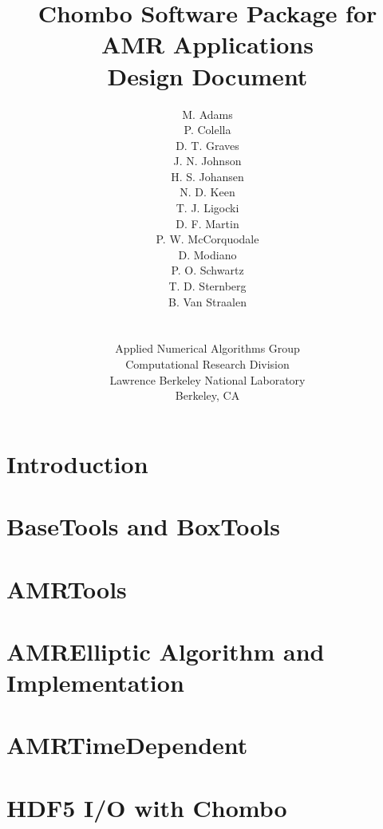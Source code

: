\documentclass[12pt]{report}
\title{Chombo Software Package for AMR Applications \\
       Design Document}
\author{M. Adams \\ P. Colella \\
        D. T. Graves \\ 
        J. N. Johnson \\
        H. S. Johansen \\
        N. D. Keen \\
        T. J. Ligocki \\ 
        D. F. Martin \\ 
        P. W. McCorquodale \\
        D. Modiano \\
        P. O. Schwartz \\
        T. D. Sternberg \\ 
        B. Van Straalen \\ 
        \\ \\
Applied Numerical Algorithms Group \\
Computational Research Division \\
Lawrence Berkeley National Laboratory \\
Berkeley, CA}
\begin{document}
\begin{figure}
\epsfxsize=3.75in
\hspace{1.0in}
\vspace{-0.75in}
\end{figure}

\maketitle

 

\tableofcontents

\chapter{Introduction}



\chapter{BaseTools and BoxTools}







\chapter{AMRTools}









\chapter{AMRElliptic Algorithm and Implementation}





\chapter{AMRTimeDependent}




\chapter{HDF5 I/O with Chombo}



\end{document}
